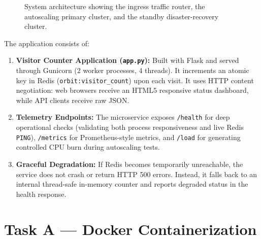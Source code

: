 \documentclass[conference]{IEEEtran}
\begin{document}
\begin{figure}[htbp]
{
}
\caption{System architecture showing the ingress traffic router, the autoscaling primary cluster, and the standby disaster-recovery cluster.}
\label{fig:arch_flow}
\end{figure}

The application consists of:
\begin{enumerate}
    \item \textbf{Visitor Counter Application (\texttt{app.py}):} Built with Flask and served through Gunicorn (2 worker processes, 4 threads). It increments an atomic key in Redis (\texttt{orbit:visitor\_count}) upon each visit. It uses HTTP content negotiation: web browsers receive an HTML5 responsive status dashboard, while API clients receive raw JSON.
    \item \textbf{Telemetry Endpoints:} The microservice exposes \texttt{/health} for deep operational checks (validating both process responsiveness and live Redis \texttt{PING}), \texttt{/metrics} for Prometheus-style metrics, and \texttt{/load} for generating controlled CPU burn during autoscaling tests.
    \item \textbf{Graceful Degradation:} If Redis becomes temporarily unreachable, the service does not crash or return HTTP 500 errors. Instead, it falls back to an internal thread-safe in-memory counter and reports degraded status in the health response.
\end{enumerate}

\section{Task A --- Docker Containerization}
\end{document}
